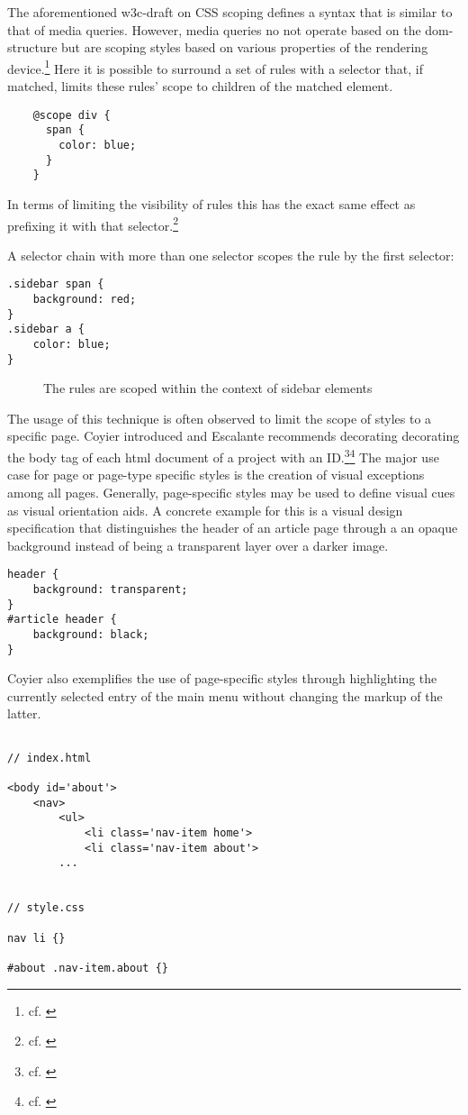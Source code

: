The aforementioned \gls{w3c}-draft on CSS scoping defines a syntax that is similar to that of media queries.
However, media queries no not operate based on the \gls{dom}-structure but are scoping styles based on various properties of the rendering device.\footnote{cf. \cite{mediaqueries}}
Here it is possible to surround a set of rules with a selector that, if matched, limits these rules' scope to children of the matched element.
\begin{verbatim}
    @scope div {
      span {
        color: blue;
      }
    }
\end{verbatim}
In terms of limiting the visibility of rules this has the exact same effect as prefixing it with that selector.\footnote{cf. \cite{cssscopingmodule}}

A selector chain with more than one selector scopes the rule by the first selector:
\begin{verbatim}
.sidebar span {
    background: red;
}
.sidebar a {
    color: blue;
}
\end{verbatim}
\begin{figure}
\caption{The rules are scoped within the context of sidebar elements}
\end{figure}

The usage of this technique is often observed to limit the scope of styles to a specific page.
Coyier introduced and Escalante recommends decorating decorating the body tag of each \gls{html} document of a project with an ID.\footnote{cf. \cite{coyieridbody}}\footnote{cf. \cite{mpgcss}}
The major use case for page or page-type specific styles is the creation of visual exceptions among all pages.
Generally, page-specific styles may be used to define visual cues as visual orientation aids.
A concrete example for this is a visual design specification that distinguishes the header of an article page through a an opaque background instead of being  a transparent layer over a darker image.

\begin{verbatim}
header {
    background: transparent;
}
#article header {
    background: black;
}
\end{verbatim}

Coyier also exemplifies the use of page-specific styles through highlighting the currently selected entry of the main menu without changing the markup of the latter.

\begin{verbatim}

// index.html

<body id='about'>
    <nav>
        <ul>
            <li class='nav-item home'>
            <li class='nav-item about'>
        ...


// style.css

nav li {}

#about .nav-item.about {}

\end{verbatim}


